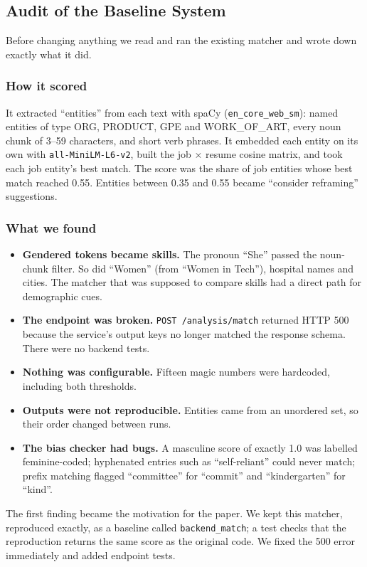\documentclass[conference,a4paper]{IEEEtran}
\begin{document}
\subsection{Audit of the Baseline System}
Before changing anything we read and ran the existing matcher and wrote down exactly what it did.

\subsubsection{How it scored} It extracted ``entities'' from each text with spaCy (\texttt{en\_\allowbreak{}core\_\allowbreak{}web\_\allowbreak{}sm}): named entities of type ORG, PRODUCT, GPE and WORK\_OF\_ART, every noun chunk of 3–59 characters, and short verb phrases. It embedded each entity on its own with \texttt{all-\allowbreak{}MiniLM-\allowbreak{}L6-\allowbreak{}v2}, built the job $\times$ resume cosine matrix, and took each job entity's best match. The score was the share of job entities whose best match reached 0.55. Entities between 0.35 and 0.55 became ``consider reframing'' suggestions.

\subsubsection{What we found} 

\begin{itemize}
\item \textbf{Gendered tokens became skills.} The pronoun ``She'' passed the noun-chunk filter. So did ``Women'' (from ``Women in Tech''), hospital names and cities. The matcher that was supposed to compare skills had a direct path for demographic cues.
\item \textbf{The endpoint was broken.} \texttt{POST /\allowbreak{}analysis/\allowbreak{}match} returned HTTP 500 because the service's output keys no longer matched the response schema. There were no backend tests.
\item \textbf{Nothing was configurable.} Fifteen magic numbers were hardcoded, including both thresholds.
\item \textbf{Outputs were not reproducible.} Entities came from an unordered set, so their order changed between runs.
\item \textbf{The bias checker had bugs.} A masculine score of exactly 1.0 was labelled feminine-coded; hyphenated entries such as ``self-reliant'' could never match; prefix matching flagged ``committee'' for ``commit'' and ``kindergarten'' for ``kind''.
\end{itemize}
The first finding became the motivation for the paper. We kept this matcher, reproduced exactly, as a baseline called \texttt{backend\_\allowbreak{}match}; a test checks that the reproduction returns the same score as the original code. We fixed the 500 error immediately and added endpoint tests.
\end{document}
